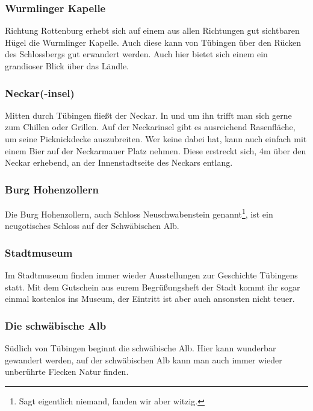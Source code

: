 \subsubsection*{Wurmlinger Kapelle}
Richtung Rottenburg erhebt sich auf einem aus allen Richtungen gut sichtbaren Hügel die Wurmlinger Kapelle. Auch diese kann von Tübingen über den Rücken des Schlossbergs gut erwandert werden. Auch hier bietet sich einem ein grandioser Blick über das Ländle.

\subsubsection*{Neckar(-insel)}
Mitten durch Tübingen fließt der Neckar. In und um ihn trifft man sich gerne zum Chillen oder Grillen. Auf der Neckarinsel gibt es ausreichend Rasenfläche, um seine Picknickdecke auszubreiten. Wer keine dabei hat, kann auch einfach mit einem Bier auf der Neckarmauer Platz nehmen. Diese erstreckt sich, 4m über den Neckar erhebend, an der Innenstadtseite des Neckars entlang.

\subsubsection*{Burg Hohenzollern}
Die Burg Hohenzollern, auch Schloss Neuschwabenstein genannt\footnote{Sagt eigentlich niemand, fanden wir aber witzig.}, ist ein neugotisches Schloss auf der Schwäbischen Alb.

\subsubsection*{Stadtmuseum}
Im Stadtmuseum finden immer wieder Ausstellungen zur Geschichte Tübingens statt. Mit dem Gutschein aus eurem Begrüßungsheft der Stadt kommt ihr sogar einmal kostenlos ins Museum, der Eintritt ist aber auch ansonsten nicht teuer.

\subsubsection*{Die schwäbische Alb}
Südlich von Tübingen beginnt die schwäbische Alb. Hier kann wunderbar gewandert werden, auf der schwäbischen Alb kann man auch immer wieder unberührte Flecken Natur finden.
